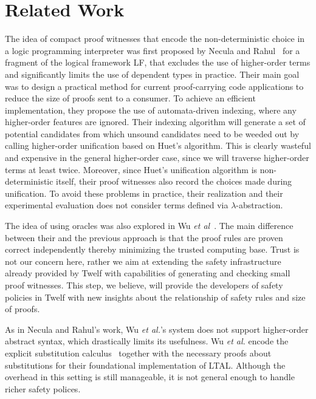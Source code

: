 \documentclass{llncs}
\begin{document}
\section{Related Work}
The idea of compact proof witnesses that encode the non-deterministic
choice in a logic programming interpreter was first proposed by Necula
and Rahul~\cite{Necula+01:oracle} for a fragment of the logical
framework LF, that excludes the use of higher-order
terms and significantly limits the use of dependent types in practice.
Their main goal was to design a practical method for current
proof-carrying code applications to reduce the size of proofs
sent to a consumer.
To achieve an efficient implementation, they propose the use of
automata-driven indexing, where any higher-order features are
ignored. Their indexing algorithm will generate a set of potential
candidates from which unsound candidates need to be weeded out by
calling higher-order unification based on Huet's algorithm. This
is clearly wasteful and expensive in the general higher-order case,
since we will traverse higher-order terms at least twice. Moreover,
since Huet's unification algorithm is non-deterministic itself, their
proof witnesses also record the choices made during unification. To
avoid these problems in practice, their realization and their
experimental evaluation does not consider terms defined via
$\lambda$-abstraction.   

The idea of using oracles was also explored in Wu {\em et
al}~\cite{Appel:PPDP03}.  
The main difference between their and the previous approach is that 
the proof rules are proven correct independently thereby minimizing
the trusted computing base.  Trust is not our concern here, rather we aim at extending the safety
infrastructure already provided by Twelf with capabilities of
generating and checking small proof witnesses. This step, we believe,
will provide the developers of safety policies in Twelf with new
insights about the relationship of safety rules and size of proofs.

As in Necula and Rahul's work, Wu {\em et al.}'s system does not
support higher-order abstract syntax, which drastically limits its
usefulness. Wu {\em et al.}\cite{Appel:PPDP03} encode the explicit
substitution calculus~\cite{Abadi:POPL90} together with the necessary
proofs about substitutions for their foundational implementation of
LTAL. Although the overhead in this setting is still manageable, it is
not general enough to handle richer safety polices.
\end{document}

